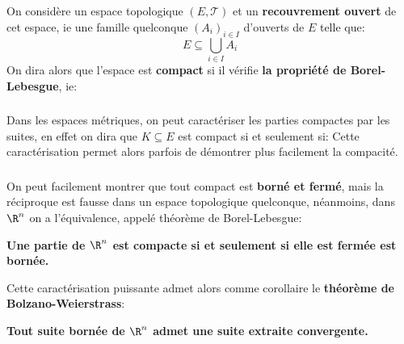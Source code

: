 \chapter*{}
On considère un espace topologique \((E, \mathcal{T})\) et un \textbf{recouvrement ouvert} de cet espace, ie une famille quelconque \((A_i)_{i \in I}\) d'ouverts de \(E\) telle que:
\[
   E \subseteq \bigcup_{i \in I} A_i  
\]
On dira alors que l'espace est \textbf{compact} si il vérifie \textbf{la propriété de Borel-Lebesgue}, ie:

\subsection*{}
Dans les espaces métriques, on peut caractériser les parties compactes par les suites, en effet on dira que \(K \subseteq E\) est compact si et seulement si:
Cette caractérisation permet alors parfois de démontrer plus facilement la compacité.
\subsection*{}
On peut facilement montrer que tout compact est \textbf{borné et fermé}, mais la réciproque est fausse dans un espace topologique quelconque, néanmoins, dans \(\R^n\) on a l'équivalence, appelé théorème de Borel-Lebesgue:
\begin{center}
   \textbf{Une partie de \(\R^n\) est compacte si et seulement si elle est fermée est bornée.}
\end{center}
Cette caractérisation puissante admet alors comme corollaire le \textbf{théorème de Bolzano-Weierstrass}:
\begin{center}
   \textbf{Tout suite bornée de \(\R^n\) admet une suite extraite convergente.}
\end{center}
